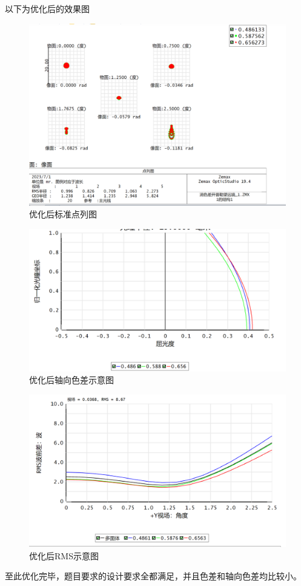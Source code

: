 \documentclass{article}
\begin{document}
以下为优化后的效果图
\begin{figure}[H]
  \centering
  \includegraphics[width=16cm]{img/19.png}
  \caption{优化后标准点列图}

  \end{figure}

  \begin{figure}[H]
    \centering
    \includegraphics[width=16cm]{img/20.png}
    \caption{优化后轴向色差示意图}
  \end{figure}

  \begin{figure}[H]
    \centering
    \includegraphics[width=16cm]{img/21.png}
    \caption{优化后RMS示意图}
  \end{figure}
  至此优化完毕，题目要求的设计要求全都满足，并且色差和轴向色差均比较小。
\end{document}
